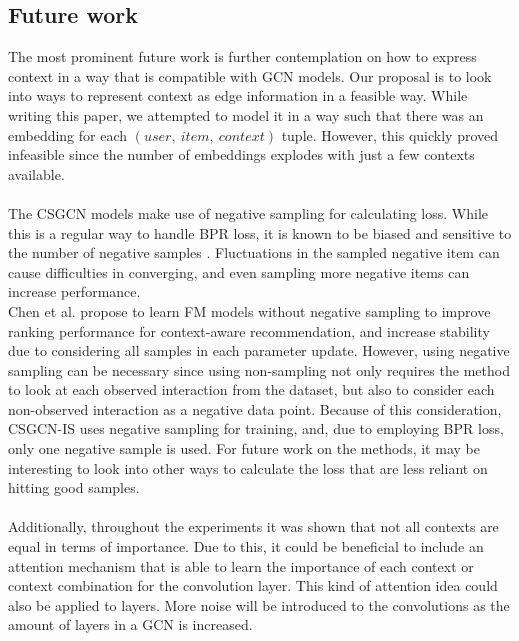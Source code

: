 
\subsection{Future work}
The most prominent future work is further contemplation on how to express context in a way that is compatible with GCN models.
Our proposal is to look into ways to represent context as edge information in a feasible way.
While writing this paper, we attempted to model it in a way such that there was an embedding for each $(user,\:item,\:context)$ tuple.
However, this quickly proved infeasible since the number of embeddings explodes with just a few contexts available.
\\\\
The CSGCN models make use of negative sampling for calculating loss.
While this is a regular way to handle BPR loss, it is known to be biased \cite{nonsampling,NegativeSampling} and sensitive to the number of negative samples \cite{NCF}.
Fluctuations in the sampled negative item can cause difficulties in converging, and even sampling more negative items can increase performance.\\
Chen et al. \cite{nonsampling} propose to learn FM models without negative sampling to improve ranking performance for context-aware recommendation, and increase stability due to considering all samples in each parameter update.
However, using negative sampling can be necessary since using non-sampling not only requires the method to look at each observed interaction from the dataset, but also to consider each non-observed interaction as a negative data point.
Because of this consideration, CSGCN-IS uses negative sampling for training, and, due to employing BPR loss, only one negative sample is used.
For future work on the methods, it may be interesting to look into other ways to calculate the loss that are less reliant on hitting good samples.
\\\\
Additionally, throughout the experiments it was shown that not all contexts are equal in terms of importance.
Due to this, it could be beneficial to include an attention mechanism that is able to learn the importance of each context or context combination for the convolution layer.
This kind of attention idea could also be applied to layers.
More noise will be introduced to the convolutions as the amount of layers in a GCN is increased.
